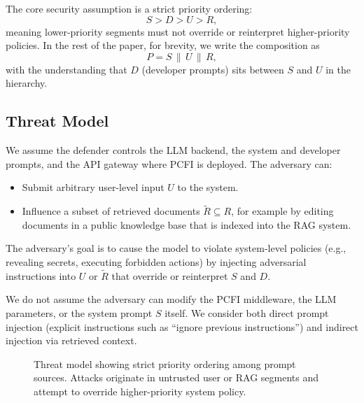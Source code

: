 \documentclass[conference]{IEEEtran}
\begin{document}
The core security assumption is a strict priority ordering:
\begin{equation}
S > D > U > R,
\end{equation}
meaning lower-priority segments must not override or reinterpret higher-priority policies. In the rest of the paper, for brevity, we write the composition as
\begin{equation}
P = S \,\|\, U \,\|\, R,
\end{equation}
with the understanding that $D$ (developer prompts) sits between $S$ and $U$ in the hierarchy.

\subsection{Threat Model}

We assume the defender controls the LLM backend, the system and developer prompts, and the API gateway where PCFI is deployed. The adversary can:
\begin{itemize}
  \item Submit arbitrary user-level input $U$ to the system.
  \item Influence a subset of retrieved documents $\tilde{R} \subseteq R$, for example by editing documents in a public knowledge base that is indexed into the RAG system.
\end{itemize}
The adversary's goal is to cause the model to violate system-level policies (e.g., revealing secrets, executing forbidden actions) by injecting adversarial instructions into $U$ or $\tilde{R}$ that override or reinterpret $S$ and $D$.

We do not assume the adversary can modify the PCFI middleware, the LLM parameters, or the system prompt $S$ itself. We consider both direct prompt injection (explicit instructions such as ``ignore previous instructions'') and indirect injection via retrieved context.

\begin{figure}[t]
\centering
\resizebox{\linewidth}{!}{}
\caption{Threat model showing strict priority ordering among prompt sources. Attacks originate in untrusted user or RAG segments and attempt to override higher-priority system policy.}
\label{fig:threat_model}
\end{figure}

\begin{table}[t]
\centering
\caption{Problem space of representative prompt-injection patterns and expected failure modes without defenses.}
\label{tab:problem_space}
\small
\resizebox{\linewidth}{!}{}
\end{table}
\end{document}
